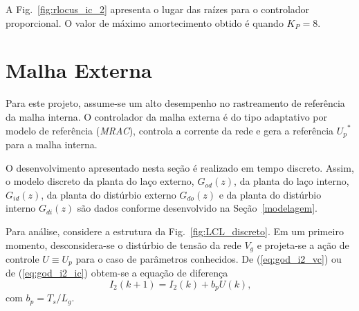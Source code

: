   A Fig.~\ref{fig:rlocus_ic_2} apresenta o lugar das raízes para o controlador proporcional. O valor de máximo amortecimento obtido é quando $K_P = 8$.


\section{Malha Externa}

  Para este projeto, assume-se um alto desempenho no rastreamento de referência da malha interna. O controlador da malha externa é do tipo adaptativo por modelo de referência (\emph{MRAC}), controla a corrente da rede e gera a referência ${U_p}^*$ para a malha interna.

  O desenvolvimento apresentado nesta seção é realizado em tempo discreto. Assim, o modelo discreto da planta do laço externo, $G_{od}(z)$, da planta do laço interno, $G_{id}(z)$, da planta do distúrbio externo $G_{do}(z)$ e da planta do distúrbio interno $G_{di}(z)$ são dados conforme desenvolvido na Seção~\ref{modelagem}.

  Para análise, considere a estrutura da Fig.~\ref{fig:LCL_discreto}. Em um primeiro momento, desconsidera-se o distúrbio de tensão da rede $V_g$ e projeta-se a ação de controle $U \equiv U_p$ para o caso de parâmetros conhecidos. %
  De (\ref{eq:god_i2_vc}) ou de (\ref{eq:god_i2_ic}) obtem-se a equação de diferença
  \begin{equation}
    I_2 (k + 1) = I_2 (k) + b_p U (k) \text{,}
    \label{eq:diferenca}
  \end{equation}
  com $b_p = T_s / L_g$.

